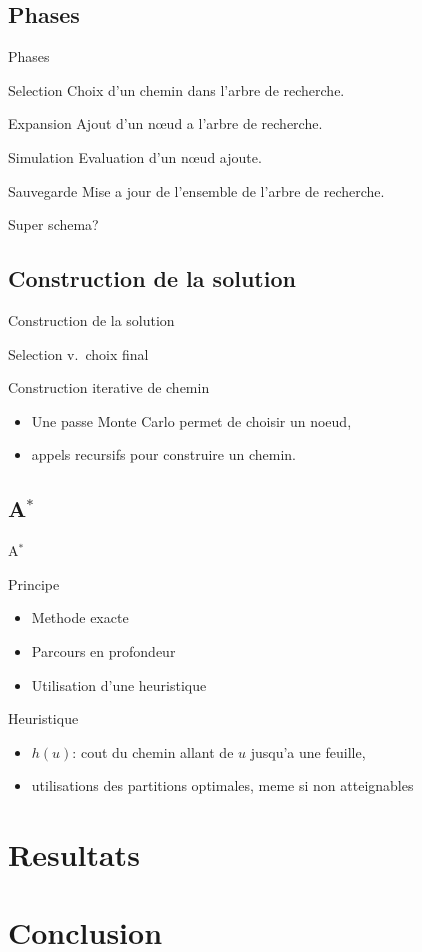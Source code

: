 \documentclass[tikz]{beamer}
\begin{document}
\subsection{Phases}
\begin{frame}[c]{Phases}
  \begin{block}{Selection}
    Choix d'un chemin dans l'arbre de recherche.
  \end{block}
  \begin{block}{Expansion}
    Ajout d'un n\oe{}ud a l'arbre de recherche.
  \end{block}
  \begin{block}{Simulation}
    Evaluation d'un n\oe{}ud ajoute.
  \end{block}
  \begin{block}{Sauvegarde}
    Mise a jour de l'ensemble de l'arbre de recherche.
  \end{block}
  Super schema?
\end{frame}

\subsection{Construction de la solution}
\begin{frame}[c]{Construction de la solution}
  \begin{block}{Selection v.\ choix final}
  \end{block}
  \begin{block}{Construction iterative de chemin}
    \begin{itemize}
      \item Une passe Monte Carlo permet de choisir un noeud,
      \item appels recursifs pour construire un chemin.
    \end{itemize}
  \end{block}
\end{frame}

\subsection{A\(^*\)}
\begin{frame}[c]{A\(^*\)}
  \begin{block}{Principe}
    \begin{itemize}
      \item Methode exacte
      \item Parcours en profondeur
      \item Utilisation d'une heuristique
    \end{itemize}
  \end{block}
  \begin{block}{Heuristique}
    \begin{itemize}
      \item \(h(u)\): cout du chemin allant de \(u\) jusqu'a une feuille,
      \item utilisations des partitions optimales, meme si non atteignables
    \end{itemize}
  \end{block}
\end{frame}

\section{Resultats}

\section*{Conclusion}
\end{document}
